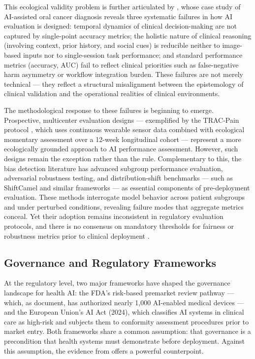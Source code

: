 This ecological validity problem is further articulated by
\citet{turchi2025ecological}, whose case study of AI-assisted oral cancer
diagnosis reveals three systematic failures in how AI evaluation is designed:
temporal dynamics of clinical decision-making are not captured by single-point
accuracy metrics; the holistic nature of clinical reasoning (involving context,
prior history, and social cues) is reducible neither to image-based inputs nor
to single-session task performance; and standard performance metrics (accuracy,
AUC) fail to reflect clinical priorities such as false-negative harm asymmetry
or workflow integration burden. These failures are not merely technical — they
reflect a structural misalignment between the epistemology of clinical validation
and the operational realities of clinical environments.

The methodological response to these failures is beginning to emerge.
Prospective, multicenter evaluation designs — exemplified by the TRAC-Pain
protocol \citep{bailes2026trac}, which uses continuous wearable sensor data
combined with ecological momentary assessment over a 12-week longitudinal
cohort — represent a more ecologically grounded approach to AI performance
assessment. However, such designs remain the exception rather than the rule.
Complementary to this, the bias detection literature has advanced subgroup
performance evaluation, adversarial robustness testing, and distribution-shift
benchmarks — such as ShiftCamel and similar frameworks — as essential
components of pre-deployment evaluation. These methods interrogate model
behavior across patient subgroups and under perturbed conditions, revealing
failure modes that aggregate metrics conceal. Yet their adoption remains
inconsistent in regulatory evaluation protocols, and there is no consensus
on mandatory thresholds for fairness or robustness metrics prior to clinical
deployment \citep{pham2025ethical}.


\subsection{Governance and Regulatory Frameworks}
\label{sec:governance}

At the regulatory level, two major frameworks have shaped the governance
landscape for health AI: the FDA's risk-based premarket review pathway — which,
as \citet{warraich2024fda} document, has authorized nearly 1,000 AI-enabled
medical devices — and the European Union's AI Act (2024), which classifies
AI systems in clinical care as high-risk and subjects them to conformity
assessment procedures prior to market entry. Both frameworks share a common
assumption: that governance is a precondition that health systems must
demonstrate before deployment. Against this assumption, the evidence from
\citet{tian2026pilottrap} offers a powerful counterpoint.

